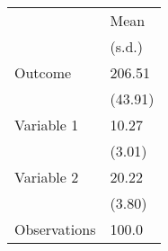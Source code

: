 \begin{tabular}{ll}
\toprule
{} &     Mean \\
{} &   (s.d.) \\
\midrule
Outcome      &   206.51 \\
             &  (43.91) \\
Variable 1   &    10.27 \\
             &   (3.01) \\
Variable 2   &    20.22 \\
             &   (3.80) \\
Observations &    100.0 \\
\bottomrule
\end{tabular}
